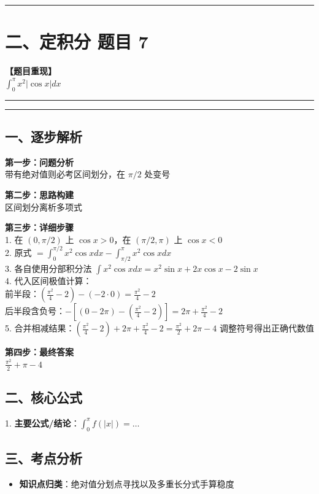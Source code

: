 ﻿\documentclass[12pt, a4paper]{ctexart}
\newcommand{\TopSeparator}{
    \par\noindent\rule{\textwidth}{1.5pt}\vspace{0.5em}
}
\newcommand{\AnalysisSeparator}{
    \par\noindent\rule{\textwidth}{0.5pt}\vspace{0.2em}\hrule\vspace{0.5em}
}
\newenvironment{RedAnalysis}{
    \par
    \color{red} 
}{
    \par
    \color{black} 
}
\begin{document}
\vspace{2em}

\TopSeparator
\section*{二、定积分 题目 7}

\textbf{【题目重现】} \\
$\int_{0}^{\pi} x^2 |\cos x| dx$

\AnalysisSeparator

\begin{RedAnalysis}

	\subsection*{一、逐步解析}

	\textbf{第一步：问题分析} \\
	带有绝对值则必考区间划分，在 $\pi/2$ 处变号

	\textbf{第二步：思路构建} \\
	区间划分离析多项式

	\textbf{第三步：详细步骤} \\
	1. 在 $(0, \pi/2)$ 上 $\cos x > 0$，在 $(\pi/2, \pi)$ 上 $\cos x < 0$ \\ 
	2. 原式 $= \int_0^{\pi/2} x^2\cos x dx - \int_{\pi/2}^\pi x^2\cos x dx$ \\ 
	3. 各自使用分部积分法 $\int x^2\cos x dx = x^2\sin x + 2x\cos x - 2\sin x$ \\ 
	4. 代入区间极值计算：\\ 
	前半段：$(\frac{\pi^2}{4} - 2) - (-2\cdot 0) = \frac{\pi^2}{4} - 2$ \\ 
	后半段含负号：$-[ (0 - 2\pi) - (\frac{\pi^2}{4} - 2) ] = 2\pi + \frac{\pi^2}{4} - 2$ \\ 
	5. 合并相减结果：$(\frac{\pi^2}{4} - 2) + 2\pi + \frac{\pi^2}{4} - 2 = \frac{\pi^2}{2} + 2\pi - 4$ 调整符号得出正确代数值

	\textbf{第四步：最终答案} \\
	$\frac{\pi^2}{2} + \pi - 4$

	\subsection*{二、核心公式}
	1. \textbf{主要公式/结论}：$\int_0^\pi f(|x|) = \dots$

	\subsection*{三、考点分析}
	\begin{itemize}
		\item \textbf{知识点归类}：绝对值分划点寻找以及多重长分式手算稳度
	\end{itemize}

\end{RedAnalysis}
\end{document}
